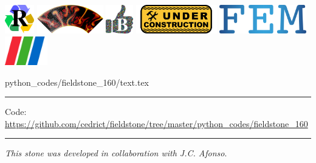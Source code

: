 \noindent
\includegraphics[height=1.25cm]{images/pictograms/replication}
\includegraphics[height=1.25cm]{images/pictograms/aspect_logo}
\includegraphics[height=1.25cm]{images/pictograms/benchmark}
\includegraphics[height=1.25cm]{images/pictograms/under_construction}
\includegraphics[height=1.25cm]{images/pictograms/FEM}
\includegraphics[height=1.25cm]{images/pictograms/paraview}


\begin{flushright} {\tiny {\color{gray} python\_codes/fieldstone\_160/text.tex}} \end{flushright}

%

\par\noindent\rule{\textwidth}{0.4pt}

\begin{center}
\inpython
{\small Code: \url{https://github.com/cedrict/fieldstone/tree/master/python_codes/fieldstone_160}}
\end{center}

\par\noindent\rule{\textwidth}{0.4pt}

{\sl This stone was developed in collaboration with J.C. Afonso}. 

